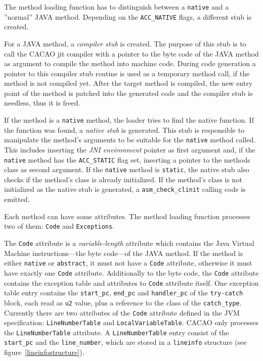 The method loading function has to distinguish between a
\texttt{native} and a ''normal'' JAVA method. Depending on the
\texttt{ACC\_NATIVE} flags, a different stub is created.

For a JAVA method, a \textit{compiler stub} is created. The purpose of
this stub is to call the CACAO jit compiler with a pointer to the byte
code of the JAVA method as argument to compile the method into machine
code. During code generation a pointer to this compiler stub routine
is used as a temporary method call, if the method is not compiled
yet. After the target method is compiled, the new entry point of the
method is patched into the generated code and the compiler stub is
needless, thus it is freed.

If the method is a \texttt{native} method, the loader tries to find
the native function. If the function was found, a \textit{native stub}
is generated. This stub is responsible to manipulate the method's
arguments to be suitable for the \texttt{native} method called. This
includes inserting the \textit{JNI environment} pointer as first
argument and, if the \texttt{native} method has the
\texttt{ACC\_STATIC} flag set, inserting a pointer to the methods
class as second argument. If the \texttt{native} method is
\texttt{static}, the native stub also checks if the method's class is
already initialized. If the method's class is not initialized as the
native stub is generated, a \texttt{asm\_check\_clinit} calling code
is emitted.

Each method can have some attributes. The method loading function
processes two of them: \texttt{Code} and \texttt{Exceptions}.

The \texttt{Code} attribute is a \textit{variable-length} attribute
which contains the Java Virtual Machine instructions---the byte
code---of the JAVA method. If the method is either \texttt{native} or
\texttt{abstract}, it must not have a \texttt{Code} attribute,
otherwise it must have exactly one \texttt{Code}
attribute. Additionally to the byte code, the \texttt{Code} attribute
contains the exception table and attributes to \texttt{Code} attribute
itself. One exception table entry contains the \texttt{start\_pc},
\texttt{end\_pc} and
\texttt{handler\_pc} of the \texttt{try-catch} block, each read as
\texttt{u2} value, plus a reference to the class of the
\texttt{catch\_type}. Currently there are two attributes of the
\texttt{Code} attribute defined in the JVM specification:
\texttt{LineNumberTable} and \texttt{LocalVariableTable}. CACAO only
processes the \texttt{LineNumberTable} attribute. A
\texttt{LineNumberTable} entry consist of the \texttt{start\_pc} and
the \texttt{line\_number}, which are stored in a \texttt{lineinfo}
structure (see figure~\ref{lineinfostructure}).

